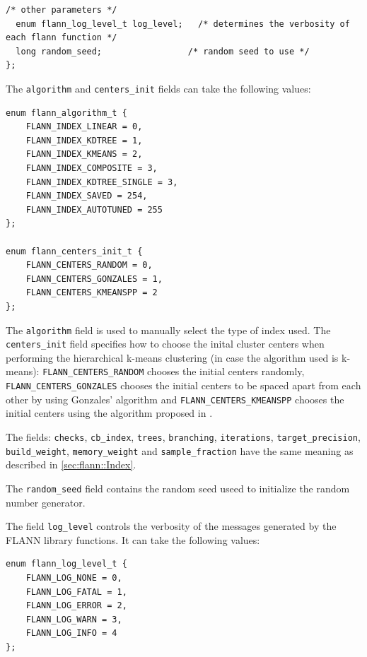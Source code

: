 \documentclass[letter,10pt]{article}
\begin{document}
\begin{description}
\begin{Verbatim}[fontsize=\footnotesize]
  /* other parameters */
  enum flann_log_level_t log_level;   /* determines the verbosity of each flann function */
  long random_seed;          		/* random seed to use */
};
\end{Verbatim}

The \texttt{algorithm} and \texttt{centers\_init} fields can take the
following values:
\begin{Verbatim}[fontsize=\footnotesize]
enum flann_algorithm_t {
	FLANN_INDEX_LINEAR = 0,
	FLANN_INDEX_KDTREE = 1,
	FLANN_INDEX_KMEANS = 2,
	FLANN_INDEX_COMPOSITE = 3,
	FLANN_INDEX_KDTREE_SINGLE = 3,
	FLANN_INDEX_SAVED = 254,
	FLANN_INDEX_AUTOTUNED = 255
};

enum flann_centers_init_t {
	FLANN_CENTERS_RANDOM = 0,
	FLANN_CENTERS_GONZALES = 1,
	FLANN_CENTERS_KMEANSPP = 2
};
\end{Verbatim}
The \texttt{algorithm} field is used to manually select the type of index
used. The \texttt{centers\_init} field specifies how to choose the inital
cluster centers when performing the hierarchical k-means clustering (in
case the algorithm used is k-means): \texttt{FLANN\_CENTERS\_RANDOM} chooses the
initial centers randomly, \texttt{FLANN\_CENTERS\_GONZALES} chooses the
initial centers to be spaced apart from each other by using Gonzales' algorithm
and \texttt{FLANN\_CENTERS\_KMEANSPP} chooses the initial centers using the algorithm
proposed in \cite{arthur_kmeanspp_2007}.

The fields: \texttt{checks}, \texttt{cb\_index}, \texttt{trees}, \texttt{branching},  
\texttt{iterations}, \texttt{target\_precision}, \texttt{build\_weight},
 \texttt{memory\_weight} and \texttt{sample\_fraction} have the
same meaning as described in \ref{sec:flann::Index}.

The \texttt{random\_seed} field contains the random seed useed to initialize the random
number generator. 

The field \texttt{log\_level} controls the verbosity of the messages generated by the FLANN
library functions. It can take the following values:
\begin{Verbatim}[fontsize=\footnotesize]
enum flann_log_level_t {
    FLANN_LOG_NONE = 0,
    FLANN_LOG_FATAL = 1,
    FLANN_LOG_ERROR = 2,
    FLANN_LOG_WARN = 3,
    FLANN_LOG_INFO = 4
};
\end{Verbatim}
\end{description}
\end{document}
